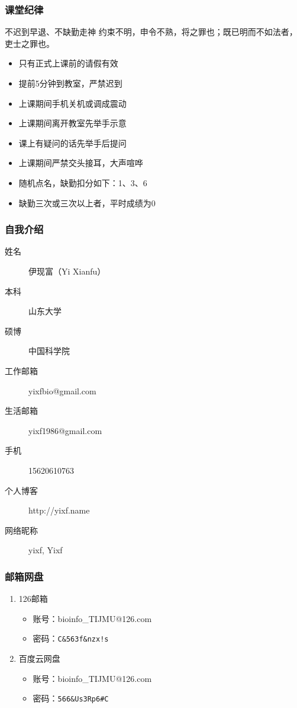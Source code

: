 \begin{frame}
  \frametitle{课堂纪律}
  \begin{alertblock}{不迟到早退、不缺勤走神}
  约束不明，申令不熟，将之罪也；既已明而不如法者，吏士之罪也。
  \end{alertblock}
  \pause
  \begin{itemize}[<+->]
    \item 只有正式上课前的请假有效
    \item 提前5分钟到教室，严禁迟到
    \item 上课期间手机关机或调成震动
    \item 上课期间离开教室先举手示意
    \item 课上有疑问的话先举手后提问
    \item 上课期间严禁交头接耳，大声喧哗
    \item 随机点名，缺勤扣分如下：1、3、6
    \item 缺勤三次或三次以上者，平时成绩为0
  \end{itemize}
\end{frame}

\begin{frame}
  \frametitle{自我介绍}
    \begin{description}
      \item[姓\qquad 名]伊现富（Yi Xianfu）
      \item[本\qquad 科]山东大学
      \item[硕\qquad 博]中国科学院
      \item[工作邮箱]\alert{yixfbio@gmail.com}
      \item[生活邮箱]yixf1986@gmail.com
      \item[手\qquad 机]\alert{15620610763}
      \item[个人博客]\alert{http://yixf.name}
      \item[网络昵称]yixf, Yixf
    \end{description}
\end{frame}

\begin{frame}
  \frametitle{邮箱网盘}
    \begin{enumerate}
      \item 126邮箱
        \begin{itemize}
          \item 账号：bioinfo\_TIJMU@126.com
          \item 密码：\texttt{C\&563f\&nzx!s}
        \end{itemize}
      \item \alert{百度云网盘}
        \begin{itemize}
	  \item \alert{账号：bioinfo\_TIJMU@126.com}
	  \item \alert{密码：\texttt{566\&Us3Rp6\#C}}
        \end{itemize}
    \end{enumerate}
\end{frame}

